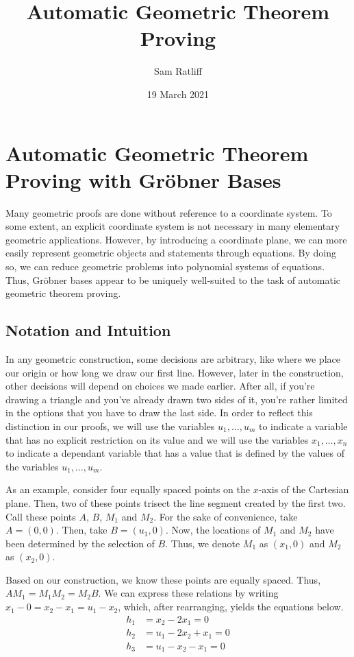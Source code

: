 \documentclass[12pt]{article}
\title{Automatic Geometric Theorem Proving}
\author{Sam Ratliff}
\date{19 March 2021}
\theoremstyle{plain}
\theoremstyle{definition}
\theoremstyle{remark}
\newcommand{\gro}{Gr\"obner }
\begin{document}
\maketitle



\section{Automatic Geometric Theorem Proving with Gröbner Bases}
Many geometric proofs are done without reference to a coordinate system. To some extent, an explicit coordinate system is not necessary in many elementary geometric applications.
However, by introducing a coordinate plane, we can more easily represent geometric objects and statements through equations. 
By doing so, we can reduce geometric problems into polynomial systems of equations. Thus, \gro bases appear to be uniquely well-suited to the task of automatic geometric theorem proving.
\subsection{Notation and Intuition}
In any geometric construction, some decisions are arbitrary, like where we place our origin or how long we draw our first line.
However, later in the construction, other decisions will depend on choices we made earlier. 
After all, if you're drawing a triangle and you've already drawn two sides of it, you're rather limited in the options that you have to draw the last side.
In order to reflect this distinction in our proofs,
we will use the variables $u_1,\dots,u_m$ to indicate a variable that has no explicit restriction on its value and 
we will use the variables $x_1,\dots,x_n$ to indicate a dependant variable that has a value that is defined by the values of the variables $u_1,\dots, u_m$. 

As an example, consider four equally spaced points on the $x$-axis of the Cartesian plane. Then, two of these points trisect the line segment created by the first two. 
Call these points $A$, $B$, $M_1$ and $M_2$. 
For the sake of convenience, take $A = (0,0)$.  Then, take $B = (u_1, 0)$. Now, the locations of $M_1$ and $M_2$ have been determined by the selection of $B$.
Thus, we denote $M_1$ as $(x_1,0)$ and $M_2$ as $(x_2,0)$.

Based on our construction, we know these points are equally spaced. Thus, $AM_1 = M_1M_2 = M_2B$.
We can express these relations by writing $x_1 - 0 = x_2  - x_1 = u_1 - x_2$, which, after rearranging, yields the equations below.
\begin{align*}
    h_1 & = x_2 - 2x_1 = 0\\
    h_2 & = u_1 - 2x_2 + x_1 = 0\\
    h_3 & = u_1 - x_2 - x_1 = 0
\end{align*}
\end{document}
